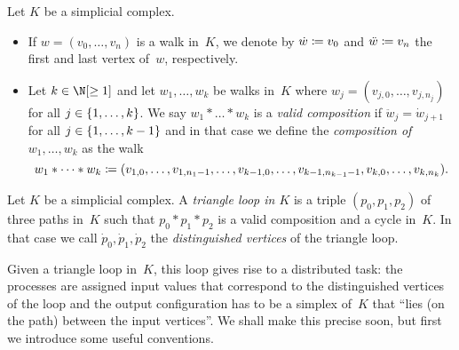 \begin{thDef}
    Let $K$ be a simplicial complex.
    \begin{itemize}
        \item
            If $w = (v_0,\dots,v_n)$ is a walk in~$K$, we denote by
            $\dot w \coloneqq v_0$ and $\ddot w \coloneqq v_n$ the first and
            last vertex of~$w$, respectively.
            
        \item
            Let $k\in\N[\geq1]$ and let $w_1,\dots,w_k$ be walks in~$K$
            where $w_j = (v_{j,0}, \dots, v_{j,n_j})$ for all $j\in\{1,\ldots,k\}$.
            We say $w_1\ast\dots\ast w_k$ is a \emph{valid composition}
            if $\ddot{w}_j = \dot{w}_{j+1}$ for all $j\in\{1,\ldots,k-1\}$ and
            in that case we define the \emph{composition of $w_1,\dots,w_k$}
            as the walk
            \[ w_1\ast\dots\ast w_k
                \coloneqq (v_{1,0},\dots,v_{1,n_1-1},
                        \dots,
                        v_{k-1,0},\dots,v_{k-1,n_{k-1}-1},
                        v_{k,0},\dots,v_{k,n_k})
            . \]
    \end{itemize}
\end{thDef}

\begin{thDef}
    Let $K$ be a simplicial complex.
    A \emph{triangle loop in $K$} is a triple $(p_0,p_1,p_2)$ of three
    paths in~$K$ such that $p_0\ast p_1\ast p_2$ is a valid composition
    and a cycle in~$K$. In that case we call $\dot{p}_0,\dot{p}_1,\dot{p}_2$
    the \emph{distinguished vertices} of the triangle loop.
\end{thDef}

Given a triangle loop in~$K$, this loop gives rise to a distributed task:
the processes are assigned input values that correspond to the distinguished
vertices of the loop and the output configuration has to be a simplex of~$K$
that \enquote{lies (on the path) between the input vertices}. We shall make this
precise soon, but first we introduce some useful conventions.

